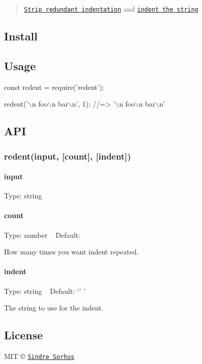 \begin{quote}
\href{https://github.com/sindresorhus/strip-indent}{\tt Strip redundant indentation} and \href{https://github.com/sindresorhus/indent-string}{\tt indent the string} \end{quote}


\subsection*{Install}




\subsection*{Usage}


\begin{DoxyCode}
const redent = require('redent');

redent('\(\backslash\)n  foo\(\backslash\)n    bar\(\backslash\)n', 1);
//=> '\(\backslash\)n foo\(\backslash\)n   bar\(\backslash\)n'
\end{DoxyCode}


\subsection*{A\+PI}

\subsubsection*{redent(input, \mbox{[}count\mbox{]}, \mbox{[}indent\mbox{]})}

\paragraph*{input}

Type\+: {\ttfamily string}

\paragraph*{count}

Type\+: {\ttfamily number} ~\newline
Default\+: {}

How many times you want {\ttfamily indent} repeated.

\paragraph*{indent}

Type\+: {\ttfamily string} ~\newline
Default\+: `' \textquotesingle{}\`{}

The string to use for the indent.

\subsection*{License}

M\+IT © \href{http://sindresorhus.com}{\tt Sindre Sorhus} 